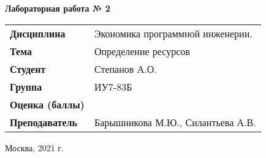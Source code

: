 \begin{center}
    \textbf{Лабораторная работа № 2} \\
    \vspace{0.5cm}
\end{center}

\vspace{4cm}

\begin{flushleft}
    \begin{tabular}{ll}
        \textbf{Дисциплина} & Экономика программной инженерии. \\
        \textbf{Тема} & Определение ресурсов \\
        \textbf{Студент} & Степанов А.О. \\
        \textbf{Группа} & ИУ7-83Б \\
        \textbf{Оценка (баллы)} & \\
        \textbf{Преподаватель} & Барышникова М.Ю., Силантьева А.В. \\
    \end{tabular}
\end{flushleft}

\vspace{4cm}

\begin{center}
    Москва, 2021 г.
\end{center}
